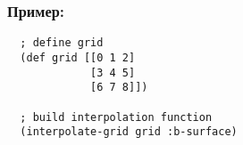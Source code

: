 \subsubsection{Пример:}

\begin{verbatim}
  ; define grid
  (def grid [[0 1 2]
             [3 4 5]
             [6 7 8]])

  ; build interpolation function
  (interpolate-grid grid :b-surface)
\end{verbatim}






